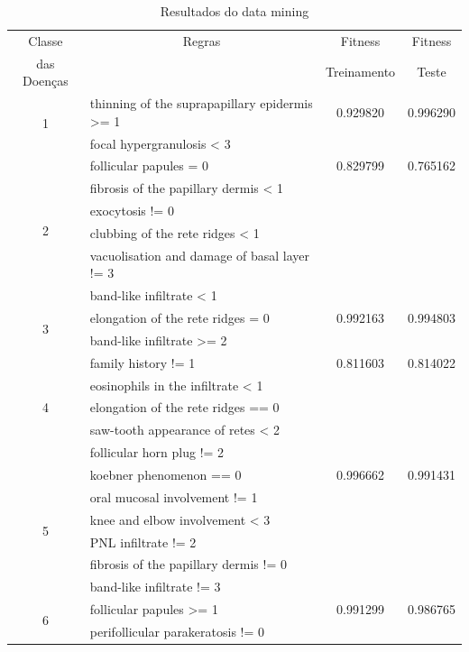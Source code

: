 \documentclass[11pt]{article}
\begin{document}
\begin{table}[h]
  \centering
  \begin{tabular}{|c|l|c|c|}
    \hline
    Classe & \multicolumn{1}{c|}{Regras}  & Fitness & Fitness\\
    das Doenças &  & Treinamento & Teste\\
    \hline
    \multirow{2}{*}{1} & thinning of the suprapapillary epidermis >= 1 & 0.929820 & 0.996290 \\
    & focal hypergranulosis < 3 & &\\
    \hline
    \multirow{6}{*}{2} & follicular papules  = 0 & 0.829799 & 0.765162\\
    & fibrosis of the papillary dermis < 1 & &\\
    & exocytosis != 0 & &\\
    & clubbing of the rete ridges < 1 & &\\
    & vacuolisation and damage of basal layer != 3 & &\\
    & band-like infiltrate < 1 & &\\
    \hline
    \multirow{2}{*}{3} & elongation of the rete ridges = 0 & 0.992163 &0.994803\\
    & band-like infiltrate >= 2 & &\\
    \hline
    \multirow{5}{*}{4} & family history != 1 & 0.811603 & 0.814022 \\
    & eosinophils in the infiltrate < 1 & &\\
    & elongation of the rete ridges == 0 & &\\
    & saw-tooth appearance of retes < 2 & &\\
    & follicular horn plug != 2 & &\\
    \hline
    \multirow{6}{*}{5} & koebner phenomenon  == 0 & 0.996662 & 0.991431 \\
    & oral mucosal involvement  != 1 & &\\
    & knee and elbow involvement  < 3 & &\\
    & PNL infiltrate != 2 & &\\
    & fibrosis of the papillary dermis != 0 & &\\
    & band-like infiltrate != 3 & &\\
    \hline
    \multirow{2}{*}{6} & follicular papules  >= 1 & 0.991299 & 0.986765 \\
    & perifollicular parakeratosis != 0 & &\\
    \hline
  \end{tabular}
  \caption{Resultados do data mining}
  \label{tab:etapa1}
\end{table}
\end{document}

